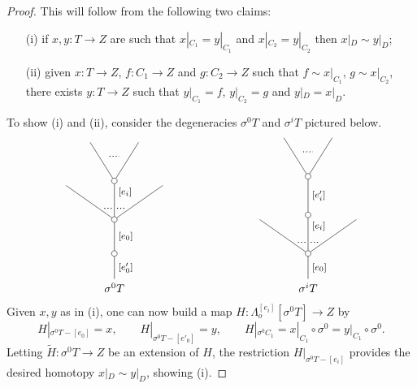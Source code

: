 \documentclass[a4paper,10pt]{article}%
\numberwithin{equation}{section}
\numberwithin{figure}{section}
\theoremstyle{definition} %
\newcommand{\1}{\ensuremath{\mathbbm 1}}%
\begin{document}
\begin{proof}
This will follow from the following two claims:
\begin{itemize}
\item[(i)] if $x,y \colon T \to Z$ are such that
$x|_{C_1} = y|_{C_1}$ and
$x|_{C_2} = y|_{C_2}$
then $x|_{D} \sim y|_{D}$;
\item[(ii)]
given $x \colon T \to Z$, $f\colon C_1 \to Z$ and
$g \colon C_2 \to Z$ such that
$f \sim x|_{C_1}$, $g \sim x|_{C_2}$,
there exists
$y \colon T \to Z$ such that
$y|_{C_1} = f$, $y|_{C_2} = g$ and
$y|_D = x|_D$.
\end{itemize}
To show (i) and (ii), consider the degeneracies
$\sigma^0 T$ and $\sigma^i T$ pictured below.
\[
\begin{tikzpicture}
[grow=up,auto,level distance=3em,
every node/.style = {font=\footnotesize},
dummy/.style={circle,draw,inner sep=0pt,minimum size=1.75mm}]
	\node at (0,0) [font=\normalsize]{$\sigma^0 T$}
		child{node [dummy] {}
		child{node [dummy] {}
			child{
			edge from parent node [swap,near end] {} node [near start,inner sep=1pt,name=Kn] {}}
			child[level distance=3.4em]{node [dummy] {}
				child{
				edge from parent node [swap,near end] {} node [name=Kn2] {}}
				child{
				edge from parent node [near end] {}
node [name=Kone2,swap] {}}
			edge from parent node [near end,swap] {$[e_i]$}
node [near start,inner sep=1pt,name=Kone,swap] {}
node [near start,inner sep=1pt,name=Kone1] {}}
			child{
			edge from parent node [near end] {}
node [swap] {}
node [near start,inner sep=1pt,name=Kn1,swap]{}}
		edge from parent node [swap] {$[e_0]$}}
		edge from parent node [swap] {$[e'_0]$}
		};
		\draw [dotted,thick] (Kone) -- (Kn) ;
		\draw [dotted,thick] (Kone1) -- (Kn1) ;
		\draw [dotted,thick] (Kone2) -- (Kn2) ;
	\node at (6,0) [font=\normalsize]{$\sigma^i T$}
		child{node [dummy] {}
			child{
			edge from parent node [swap,near end] {} node [near start,inner sep=1pt,name=Kn] {}}
			child[level distance=3.4em]{node [dummy] {}
			child{node [dummy] {}
				child{
				edge from parent node [swap,near end] {} node [name=Kn2] {}}
				child{
				edge from parent node [near end] {}
node [name=Kone2,swap] {}}
			edge from parent node [swap] {$[e'_i]$}}
			edge from parent node [near end,swap] {$[e_i]$}
node [near start,inner sep=1pt,name=Kone,swap] {}
node [near start,inner sep=1pt,name=Kone1] {}}
			child{
			edge from parent node [near end] {}
node [swap] {}
node [near start,inner sep=1pt,name=Kn1,swap]{}}
		edge from parent node [swap] {$[e_0]$}
		};
		\draw [dotted,thick] (Kone) -- (Kn) ;
		\draw [dotted,thick] (Kone1) -- (Kn1) ;
		\draw [dotted,thick] (Kone2) -- (Kn2) ;
\end{tikzpicture}
\]
Given $x,y$ as in (i), one can now build a map
$H \colon \Lambda_o^{[e_i]}[\sigma^0 T] \to Z$ by
\[
	H|_{\sigma^0 T - [e_0]} = x,
\qquad
	H|_{\sigma^0 T - [e'_0]} = y,
\qquad
	H|_{\sigma^0 C_1} = 
	x|_{C_1} \circ \sigma^0 = 
	y|_{C_1} \circ \sigma^0.
\]
Letting $\widetilde{H}\colon \sigma^0 T \to Z$
be an extension of $H$,
the restriction $H|_{\sigma^0 T - [e_i]}$
provides the desired homotopy 
$x|_{D} \sim y|_{D}$, showing (i).



\end{proof}
\end{document}
